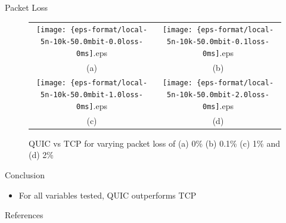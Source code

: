 \documentclass[final]{beamer}
\newlength{\onecolwid}
\begin{document}
\begin{frame}[t]
\begin{columns}[t]
\begin{column}{\onecolwid}
\begin{block}{Packet Loss}
\begin{figure}
\begin{tabular}{c c}
\texttt{[image: \{eps-format/local-5n-10k-50.0mbit-0.0loss-0ms]}.eps} &
\texttt{[image: \{eps-format/local-5n-10k-50.0mbit-0.1loss-0ms]}.eps} \\
\tiny (a) & \tiny (b) \\
\texttt{[image: \{eps-format/local-5n-10k-50.0mbit-1.0loss-0ms]}.eps} &
\texttt{[image: \{eps-format/local-5n-10k-50.0mbit-2.0loss-0ms]}.eps} \\
\tiny (c) & \tiny (d) \\
\end{tabular}
\caption{QUIC vs TCP for varying packet loss of (a) 0\% (b) 0.1\% (c) 1\% and (d) 2\%}
\end{figure}
\end{block}

\begin{block}{Conclusion}

\begin{itemize}
\item For all variables tested, QUIC outperforms TCP
\end{itemize}

\end{block}


\begin{block}{References}

\nocite{*} %
\small{
\vspace{0.75in}}

\end{block}


\end{column} %
\end{columns} %
\end{frame} %
\end{document}

